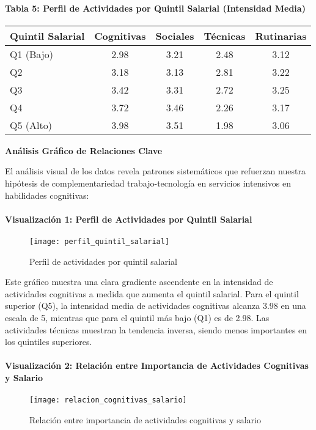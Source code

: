 \documentclass{article}
\theoremstyle{remark}
\theoremstyle{definition}
\begin{document}
\begin{tcolorbox}
\paragraph{Tabla 5: Perfil de Actividades por Quintil Salarial (Intensidad Media)}
\begin{table}[H]
\centering
\begin{tabular}{|l|c|c|c|c|}
\hline
\textbf{Quintil Salarial} & \textbf{Cognitivas} & \textbf{Sociales} & \textbf{Técnicas} & \textbf{Rutinarias} \\
\hline
Q1 (Bajo) & 2.98 & 3.21 & 2.48 & 3.12 \\
Q2 & 3.18 & 3.13 & 2.81 & 3.22 \\
Q3 & 3.42 & 3.31 & 2.72 & 3.25 \\
Q4 & 3.72 & 3.46 & 2.26 & 3.17 \\
Q5 (Alto) & 3.98 & 3.51 & 1.98 & 3.06 \\
\hline
\end{tabular}
\end{table}

\textbf{Análisis Gráfico de Relaciones Clave}

El análisis visual de los datos revela patrones sistemáticos que refuerzan nuestra hipótesis de complementariedad trabajo-tecnología en servicios intensivos en habilidades cognitivas:

\paragraph{Visualización 1: Perfil de Actividades por Quintil Salarial}
\begin{figure}[H]
    \centering
    \texttt{[image: perfil\_quintil\_salarial]}
    \caption{Perfil de actividades por quintil salarial}
    \label{fig:perfil_quintil}
\end{figure}

Este gráfico muestra una clara gradiente ascendente en la intensidad de actividades cognitivas a medida que aumenta el quintil salarial. Para el quintil superior (Q5), la intensidad media de actividades cognitivas alcanza 3.98 en una escala de 5, mientras que para el quintil más bajo (Q1) es de 2.98. Las actividades técnicas muestran la tendencia inversa, siendo menos importantes en los quintiles superiores.

\paragraph{Visualización 2: Relación entre Importancia de Actividades Cognitivas y Salario}
\begin{figure}[H]
    \centering
    \texttt{[image: relacion\_cognitivas\_salario]}
    \caption{Relación entre importancia de actividades cognitivas y salario}
    \label{fig:cognitivas_salario}
\end{figure}


\end{tcolorbox}
\end{document}
